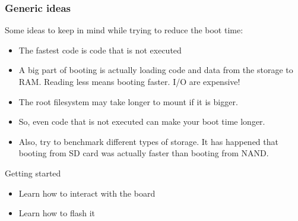 \begin{frame}
\frametitle{Generic ideas}
Some ideas to keep in mind while trying to reduce the boot time:
\begin{itemize}
\item The fastest code is code that is not executed
\item A big part of booting is actually loading code and data from the
      storage to RAM. Reading less means booting faster. I/O are
      expensive!
\item The root filesystem may take longer to mount if it is bigger.
\item So, even code that is not executed can make your boot time
      longer.
\item Also, try to benchmark different types of storage. It has
      happened that booting from SD card was actually faster than
      booting from NAND.
\end{itemize}
\end{frame}

\setuplabframe
{Getting started}
{
\begin{itemize}
\item Learn how to interact with the board
\item Learn how to flash it
\end{itemize}
}

